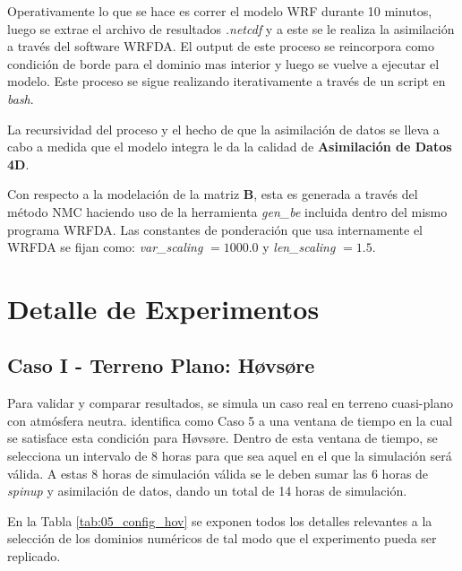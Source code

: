 Operativamente lo que se hace es correr el modelo WRF durante 10 minutos, luego se extrae el archivo de resultados \emph{.netcdf} y a este se le realiza la asimilación a través del software WRFDA. El output de este proceso se reincorpora como condición de borde para el dominio mas interior y luego se vuelve a ejecutar el modelo. Este proceso se sigue realizando iterativamente a través de un script en \emph{bash}.

La recursividad del proceso y el hecho de que la asimilación de datos se lleva a cabo a medida que el modelo integra le da la calidad de \textbf{Asimilación de Datos 4D}.

Con respecto a la modelación de la matriz $\textbf{B}$, esta es generada a través del método NMC \citep{https://doi.org/10.5065/d68s4mvh} haciendo uso de la herramienta \emph{gen\_be} incluida dentro del mismo programa WRFDA. Las constantes de ponderación que usa internamente el WRFDA se fijan como: \emph{var\_scaling} $=1000.0$ y \emph{len\_scaling} $=1.5$.
\newpage
\section{Detalle de Experimentos}
\subsection{Caso I - Terreno Plano: Høvsøre}
Para validar y comparar resultados, se simula un caso real en terreno cuasi-plano con atmósfera neutra. \cite{Pea2013} identifica como Caso 5 a una ventana de tiempo en la cual se satisface esta condición para Høvsøre. Dentro de esta ventana de tiempo, se selecciona un intervalo de 8 horas para que sea aquel en el que la simulación será válida. A estas 8 horas de simulación válida se le deben sumar las 6 horas de \emph{spinup} y asimilación de datos, dando un total de 14 horas de simulación.

En la Tabla \ref{tab:05_config_hov} se exponen todos los detalles relevantes a la selección de los dominios numéricos de tal modo que el experimento pueda ser replicado.

